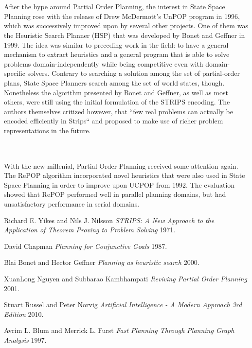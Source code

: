 \documentclass{article}
\begin{document}
\\\\

After the hype around Partial Order Planning, the interest in State Space Planning rose with the release of Drew McDermott's UnPOP
program in 1996, which was successively improved upon by several other projects. One of them was the Heuristic
Search Planner (HSP) that was developed by Bonet and Geffner in 1999.
The idea was similar to preceding work in the field: to have a general mechanism to extract heuristics and a general program
that is able to solve problems domain-independently while being competitive even with domain-specific solvers. \cite{bonet00}
Contrary to searching a solution among the set of partial-order plans, State Space Planners
search among the set of world states, though. Nonetheless the algorithm presented by Bonet and Geffner, as well
as most others, were still using the initial formulation of the STRIPS encoding.
The authors themselves critized however, that ``few real problems can actually be
encoded efficiently in Strips`` \cite{bonet00} and proposed to make use of richer
problem representations in the future.

\\\\

With the new millenial, Partial Order Planning received some attention again. The RePOP
algorithm incorporated novel heuristics that were also used in State Space Planning
in order to improve upon UCPOP from 1992. The evaluation showed that RePOP performed well
in parallel planning domains, but had unsatisfactory performance in serial domains. \cite{nguyen01}


\begin{thebibliography}{1}
 Richard E. Yikes and Nils J. Nilsson {\em STRIPS: A New Approach
to the Application of Theorem Proving to Problem Solving}  1971.

 David Chapman {\em Planning for Conjunctive Goals} 1987.


 Blai Bonet and Hector Geffner {\em Planning as heuristic search} 2000.

 XuanLong Nguyen and Subbarao Kambhampati {\em Reviving Partial
Order Planning} 2001.

 Stuart Russel and Peter Norvig {\em Artificial Intelligence - A Modern
Approach 3rd Edition} 2010.

 Avrim L. Blum and Merrick L. Furst {\em Fast Planning Through Planning Graph
Analysis} 1997.
\end{thebibliography}
\end{document}
